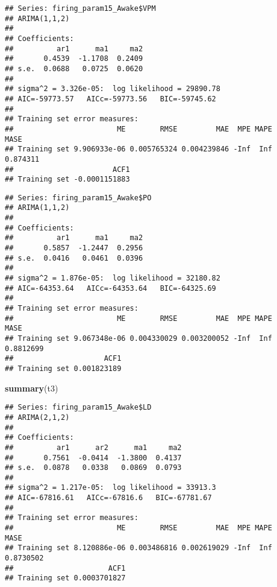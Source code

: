 \documentclass[
]{article}
\newenvironment{Shaded}{\begin{snugshade}}{\end{snugshade}}
\newcommand{\FunctionTok}[1]{\textcolor[rgb]{0.13,0.29,0.53}{\textbf{#1}}}
\newcommand{\NormalTok}[1]{#1}
\newcommand{\OtherTok}[1]{\textcolor[rgb]{0.56,0.35,0.01}{#1}}
\newcommand{\SpecialCharTok}[1]{\textcolor[rgb]{0.81,0.36,0.00}{\textbf{#1}}}
\begin{document}
\begin{verbatim}
## Series: firing_param15_Awake$VPM 
## ARIMA(1,1,2) 
## 
## Coefficients:
##          ar1      ma1     ma2
##       0.4539  -1.1708  0.2409
## s.e.  0.0688   0.0725  0.0620
## 
## sigma^2 = 3.326e-05:  log likelihood = 29890.78
## AIC=-59773.57   AICc=-59773.56   BIC=-59745.62
## 
## Training set error measures:
##                        ME        RMSE         MAE  MPE MAPE     MASE
## Training set 9.906933e-06 0.005765324 0.004239846 -Inf  Inf 0.874311
##                       ACF1
## Training set -0.0001151883
\end{verbatim}

\begin{Shaded}
\end{Shaded}

\begin{verbatim}
## Series: firing_param15_Awake$PO 
## ARIMA(1,1,2) 
## 
## Coefficients:
##          ar1      ma1     ma2
##       0.5857  -1.2447  0.2956
## s.e.  0.0416   0.0461  0.0396
## 
## sigma^2 = 1.876e-05:  log likelihood = 32180.82
## AIC=-64353.64   AICc=-64353.64   BIC=-64325.69
## 
## Training set error measures:
##                        ME        RMSE         MAE  MPE MAPE      MASE
## Training set 9.067348e-06 0.004330029 0.003200052 -Inf  Inf 0.8812699
##                     ACF1
## Training set 0.001823189
\end{verbatim}

\begin{Shaded}
\begin{Highlighting}[]
\FunctionTok{summary}\NormalTok{(t3)}
\end{Highlighting}
\end{Shaded}

\begin{verbatim}
## Series: firing_param15_Awake$LD 
## ARIMA(2,1,2) 
## 
## Coefficients:
##          ar1      ar2      ma1     ma2
##       0.7561  -0.0414  -1.3800  0.4137
## s.e.  0.0878   0.0338   0.0869  0.0793
## 
## sigma^2 = 1.217e-05:  log likelihood = 33913.3
## AIC=-67816.61   AICc=-67816.6   BIC=-67781.67
## 
## Training set error measures:
##                        ME        RMSE         MAE  MPE MAPE      MASE
## Training set 8.120886e-06 0.003486816 0.002619029 -Inf  Inf 0.8730502
##                      ACF1
## Training set 0.0003701827
\end{verbatim}
\end{document}
